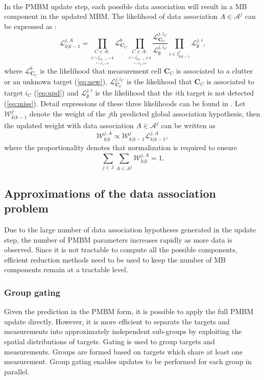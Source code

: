 ~\\
In the PMBM update step, each possible data association will result in a MB component in the updated MBM. The likelihood of data association $A\in\mathcal{A}^j$ can be expressed as \cite{pmbmextended2}:
\begin{equation}
\mathcal{L}^{j,A}_{k|k-1}=\prod_{\underset{\underset{C\cap \mathbb{M}_k\neq \emptyset}{C\cap \mathbb{I}^j_{k|k-1}=\emptyset}}{C\in A:}}\mathcal{L}^b_{\mathbf{C}_C}\prod_{\underset{\underset{C\cap \mathbb{M}_k\neq \emptyset}{C\cap \mathbb{I}^j_{k|k-1}\neq\emptyset}}{C\in A:}}\frac{\mathcal{L}^{j,i_C}_{\mathbf{C}_C}}{\mathcal{L}^{j,i_C}_{\emptyset}}\prod_{i\in\mathbb{I}^j_{k|k-1}}\mathcal{L}^{j,i}_{\emptyset},
\end{equation}
where $\mathcal{L}^b_{\mathbf{C}_C}$ is the likelihood that measurement cell $\mathbf{C}_C$ is associated to a clutter or an unknown target (\ref{eq:new}), $\mathcal{L}^{j,i_C}_{\mathbf{C}_C}$ is the likelihood that $\mathbf{C}_C$ is associated to target $i_C$ (\ref{eq:upd}) and $\mathcal{L}^{j,i}_{\emptyset}$ is the likelihood that the $i$th target is not detected (\ref{eq:miss}). Detail expressions of these three likelihoods can be found in \cite{pmbmextended2}. Let $\mathcal{W}^j_{k|k-1}$ denote the weight of the $j$th predicted global association hypothesis, then the updated weight with data association $A\in\mathcal{A}^j$ can be written as
\begin{equation}
\mathcal{W}^{j,A}_{k|k}\propto \mathcal{W}^{j}_{k|k-1}\mathcal{L}^{j,A}_{k|k-1},
\end{equation}
where the proportionality denotes that normalization is required to ensure
\begin{equation}
    \sum_{j\in\mathbb{J}}\sum_{A\in\mathcal{A}^j}\mathcal{W}^{j,A}_{k|k}=1.
\end{equation}

\subsection{Approximations of the data association problem}
Due to the large number of data association hypotheses generated in the update step, the number of PMBM parameters increases rapidly as more data is observed. Since it is not tractable to compute all the possible components, efficient reduction methods need to be used to keep the number of MB components remain at a tractable level. 


\subsubsection{Group gating}
Given the prediction in the PMBM form, it is possible to apply the full PMBM update directly. However, it is more efficient to separate the targets and measurements into approximately independent sub-groups by exploiting the spatial distributions of targets. Gating \cite[Sec. 2.2.2.2]{gating} is used to group targets and measurements. Groups are formed based on targets which share at least one measurement. Group gating enables updates to be performed for each group in parallel.



